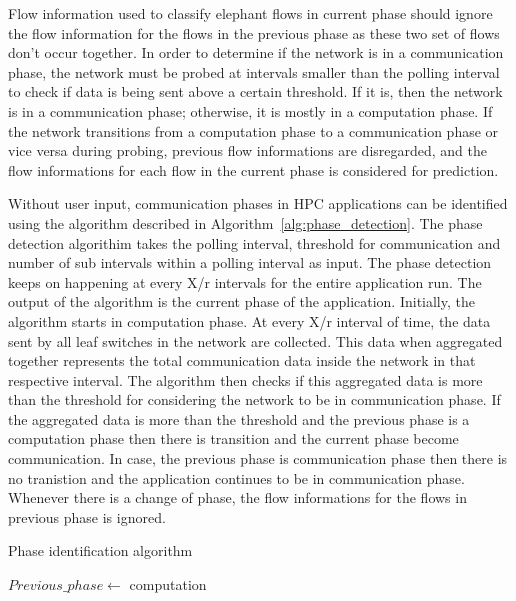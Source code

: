 Flow information used to
classify elephant flows in current phase should ignore the flow information for the flows in the
previous phase as these two set of flows  don't occur together.
In order to
determine if the network is in a communication phase, the network must be
probed at intervals smaller than the polling interval to check if data is being
sent above a certain threshold. If it is, then the network is in a
communication phase; otherwise, it is mostly in a computation phase.
If the
network transitions from a computation phase to a communication phase or vice versa during
probing, previous flow informations are disregarded, and the flow
informations for each flow in the current phase is considered for
prediction. 

Without user input, communication phases in HPC applications can be
identified using the algorithm described in Algorithm~\ref{alg:phase_detection}.
The phase detection algorithim takes the polling interval, threshold for communication
and number of sub intervals within a polling interval as input. The phase detection 
keeps on happening at every X/r intervals for the entire application run. 
The output of the algorithm is the current phase of the application. Initially, the
algorithm starts in computation phase. At every X/r interval of time, the data sent by all leaf
switches in the network are collected. This data when aggregated together represents the total communication data
inside the network in that respective interval. The algorithm then checks if this aggregated data is more than the 
threshold for considering the network to be in communication phase. If the aggregated data is more than the 
threshold and the previous phase is a computation phase then there is transition and the current phase become communication.
In case, the previous phase is communication phase then there is no tranistion and the application continues to be in communication phase.
Whenever there is a change of 
phase, the flow informations for the flows in previous phase is ignored.

\begin{algorithm}
\DontPrintSemicolon

\caption{Phase identification algorithm}
\label{alg:phase_detection}


$Previous\_phase \gets$ computation\;
\end{algorithm}
